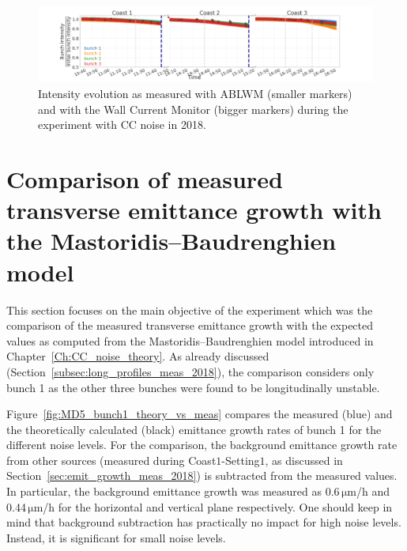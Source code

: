 \begin{figure}
   \centering
   \includegraphics[width=1.0\textwidth]{images/Ch5/MD5_overview_intensity_with_wall_current_monitor.png}
   \caption{Intensity evolution as measured with ABLWM (smaller markers) and with the Wall Current Monitor (bigger markers) during the experiment with CC noise in 2018.}
   \label{fig:MD5_overview_intensity}
\end{figure}

\section{Comparison of measured transverse emittance growth with the Mastoridis--Baudrenghien model}\label{sec:meas_2018_vs_theory}
This section focuses on the main objective of the experiment which was the comparison of the measured transverse emittance growth with the expected values as computed from the Mastoridis--Baudrenghien model introduced in Chapter~\ref{Ch:CC_noise_theory}. As already discussed (Section~\ref{subsec:long_profiles_meas_2018}), the comparison considers only bunch 1 as the other three bunches were found to be longitudinally unstable.

Figure~\ref{fig:MD5_bunch1_theory_vs_meas} compares the measured (blue) and the theoretically calculated (black) emittance growth rates of bunch 1 for the different noise levels. For the comparison, the background emittance growth rate from other sources (measured during Coast$1$-Setting$1$, as discussed in Section~\ref{sec:emit_growth_meas_2018}) is subtracted from the measured values. In particular, the background emittance growth was measured as 0.6\,$\mathrm{\mu m}$/h and 0.44\,$\mathrm{\mu m}$/h for the horizontal and vertical plane respectively. One should keep in mind that background subtraction has practically no impact for high noise levels. Instead, it is significant for small noise levels.


